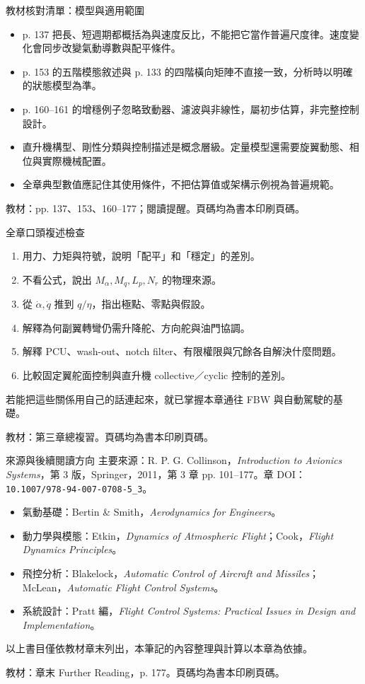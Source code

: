 \documentclass[aspectratio=169,11pt]{beamer}
\newcommand{\src}[1]{\par\vfill{\scriptsize\color{teal}教材：#1。頁碼均為書本印刷頁碼。}}
\newcommand{\slide}[3]{\begin{frame}[t]{#1}#3\src{#2}\end{frame}}
\newcommand{\bi}{\begin{itemize}\setlength{\itemsep}{5pt}}
\newcommand{\ei}{\end{itemize}}
\newcommand{\key}[1]{\par\medskip{\color{teal}\bfseries #1}\par\smallskip}
\begin{document}
\slide{教材核對清單：模型與適用範圍}{pp. 137、153、160--177；閱讀提醒}{
\bi
\item p. 137 把長、短週期都概括為與速度反比，不能把它當作普遍尺度律。速度變化會同步改變氣動導數與配平條件。
\item p. 153 的五階模態敘述與 p. 133 的四階橫向矩陣不直接一致，分析時以明確的狀態模型為準。
\item p. 160--161 的增穩例子忽略致動器、濾波與非線性，屬初步估算，非完整控制設計。
\item 直升機構型、剛性分類與控制描述是概念層級。定量模型還需要旋翼動態、相位與實際機械配置。
\item 全章典型數值應記住其使用條件，不把估算值或架構示例視為普遍規範。
\ei
}
\slide{全章口頭複述檢查}{第三章總複習}{
\begin{enumerate}\setlength{\itemsep}{7pt}
\item 用力、力矩與符號，說明「配平」和「穩定」的差別。
\item 不看公式，說出 $M_\alpha,M_q,L_p,N_r$ 的物理來源。
\item 從 $\dot\alpha,\dot q$ 推到 $q/\eta$，指出極點、零點與假設。
\item 解釋為何副翼轉彎仍需升降舵、方向舵與油門協調。
\item 解釋 PCU、wash-out、notch filter、有限權限與冗餘各自解決什麼問題。
\item 比較固定翼舵面控制與直升機 collective／cyclic 控制的差別。
\end{enumerate}
若能把這些關係用自己的話連起來，就已掌握本章通往 FBW 與自動駕駛的基礎。
}
\slide{來源與後續閱讀方向}{章末 Further Reading，p. 177}{
\small
主要來源：R. P. G. Collinson，\textit{Introduction to Avionics Systems}，第 3 版，Springer，2011，第 3 章 pp. 101--177。章 DOI：\texttt{10.1007/978-94-007-0708-5\_3}。
\key{教材推薦書目的選讀方向}
\bi
\item 氣動基礎：Bertin \& Smith，\textit{Aerodynamics for Engineers}。
\item 動力學與模態：Etkin，\textit{Dynamics of Atmospheric Flight}；Cook，\textit{Flight Dynamics Principles}。
\item 飛控分析：Blakelock，\textit{Automatic Control of Aircraft and Missiles}；McLean，\textit{Automatic Flight Control Systems}。
\item 系統設計：Pratt 編，\textit{Flight Control Systems: Practical Issues in Design and Implementation}。
\ei
以上書目僅依教材章末列出，本筆記的內容整理與計算以本章為依據。
}
\end{document}
